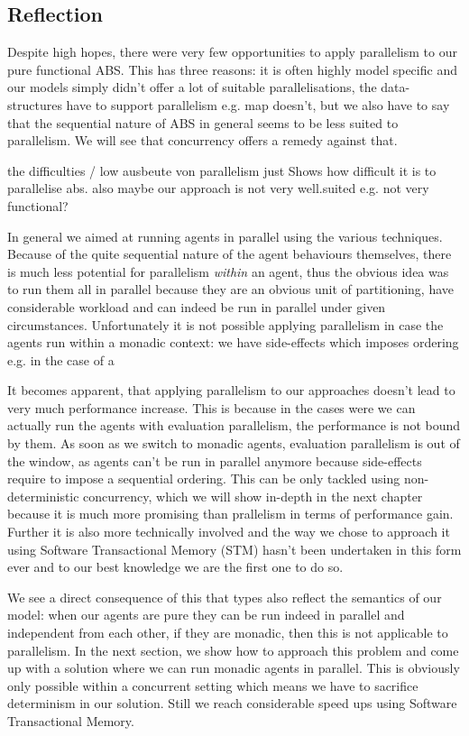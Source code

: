 \subsection{Reflection}
Despite high hopes, there were very few opportunities to apply parallelism to our pure functional ABS. This has three reasons: it is often highly model specific and our models simply didn't offer a lot of suitable parallelisations, the data-structures have to support parallelism e.g. map doesn't, but we also have to say that the sequential nature of ABS in general seems to be less suited to parallelism. We will see that concurrency offers a remedy against that.

the difficulties / low ausbeute von parallelism just Shows how difficult it is to parallelise abs. also maybe our approach is not very well.suited e.g. not very functional?

In general we aimed at running agents in parallel using the various techniques. Because of the quite sequential nature of the agent behaviours themselves, there is much less potential for parallelism \textit{within} an agent, thus the obvious idea was to run them all in parallel because they are an obvious unit of partitioning, have considerable workload and can indeed be run in parallel under given circumstances.
Unfortunately it is not possible applying parallelism in case the agents run within a monadic context: we have side-effects which imposes ordering e.g. in the case of a

It becomes apparent, that applying parallelism to our approaches doesn't lead to very much performance increase. This is because in the cases were we can actually run the agents with evaluation parallelism, the performance is not bound by them. As soon as we switch to monadic agents, evaluation parallelism is out of the window, as agents can't be run in parallel anymore because side-effects require to impose a sequential ordering. This can be only tackled using non-deterministic concurrency, which we will show in-depth in the next chapter because it is much more promising than prallelism in terms of performance gain. Further it is also more technically involved and the way we chose to approach it using Software Transactional Memory (STM) hasn't been undertaken in this form ever and to our best knowledge we are the first one to do so.

We see a direct consequence of this that types also reflect the semantics of our model: when our agents are pure they can be run indeed in parallel and independent from each other, if they are monadic, then this is not applicable to parallelism. In the next section, we show how to approach this problem and come up with a solution where we can run monadic agents in parallel. This is obviously only possible within a concurrent setting which means we have to sacrifice determinism in our solution. Still we reach considerable speed ups using Software Transactional Memory.

